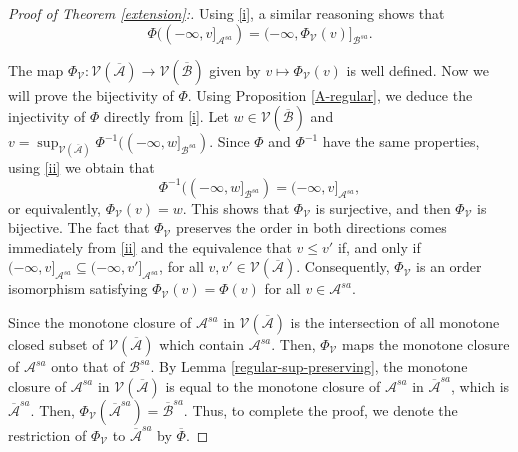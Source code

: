 \documentclass[12pt]{amsart}
\theoremstyle{definition}
\theoremstyle{remark}
\numberwithin{equation}{section}
\begin{document}
\begin{proof}[Proof of Theorem \ref{extension}:]
	Using \eqref{i}, a  similar reasoning  shows that \begin{equation}\label{ii}
		\Phi((-\infty,v]_{\mathcal{A}^{sa}})=(-\infty,\Phi_\mathcal{V}(v)]_{\mathcal{B}^{sa}}.
	\end{equation}  
	
	The map $\Phi_{\mathcal{V}}:\mathcal{V}(\overline{\mathcal{A}})\to \mathcal{V}(\overline{\mathcal{B}})$ given  by $v\mapsto \Phi_{\mathcal{V}}(v)$ is well defined. Now we will prove the bijectivity of $\Phi$. Using Proposition \ref{A-regular}, we deduce the injectivity of $\Phi$ directly from  \eqref{i}.  Let $w\in  \mathcal{V}(\overline{\mathcal{B}})$ and  $v=\sup_{\mathcal{V}(\overline{\mathcal{A}})}\Phi^{-1}((-\infty,w]_{\mathcal{B}^{sa}})$. Since $\Phi$ and $\Phi^{-1}$ have the same properties, using \eqref{ii} we obtain that $$\Phi^{-1}((-\infty,w]_{\mathcal{B}^{sa}})=(-\infty,v]_{\mathcal{A}^{sa}},$$
	or equivalently, $\Phi_\mathcal{V}(v)=w$. This shows that $\Phi_\mathcal{V}$ is surjective, and then $\Phi_\mathcal{V}$ is bijective. The fact that $\Phi_\mathcal{V}$ preserves the order in both directions comes immediately from \eqref{ii} and  the equivalence that $v\leq v'$ if, and only if $(-\infty,v]_{\mathcal{A}^{sa}}\subseteq (-\infty,v']_{\mathcal{A}^{sa}}$, for all $v,v'\in \mathcal{V}(\overline{\mathcal{A}})$. Consequently, $\Phi_\mathcal{V}$ is an order isomorphism satisfying $\Phi_\mathcal{V}(v)=\Phi(v)$ for all $v\in\mathcal{A}^{sa}$. 
	
	Since the monotone closure of $\mathcal{A}^{sa}$ in $\mathcal{V}(\overline{\mathcal{A}})$ is the intersection of all monotone closed subset of $\mathcal{V}(\overline{\mathcal{A}})$ which contain $\mathcal{A}^{sa}$. Then, $\Phi_\mathcal{V}$ maps  the monotone closure of $\mathcal{A}^{sa}$ onto that  of $\mathcal{B}^{sa}$.  By Lemma \ref{regular-sup-preserving},  the monotone closure of $\mathcal{A}^{sa}$  in $\mathcal{V}(\overline{\mathcal{A}})$  is equal to the   monotone closure of $\mathcal{A}^{sa}$ in $\overline{\mathcal{A}}^{sa}$, which is $\overline{\mathcal{A}}^{sa}$. Then, $\Phi_\mathcal{V}(\overline{\mathcal{A}}^{sa})=\overline{\mathcal{B}}^{sa}$. Thus, to complete the proof, we denote the restriction of $\Phi_\mathcal{V}$ to $\overline{\mathcal{A}}^{sa}$ by $\overline{\Phi}$.
\end{proof}
\end{document}
